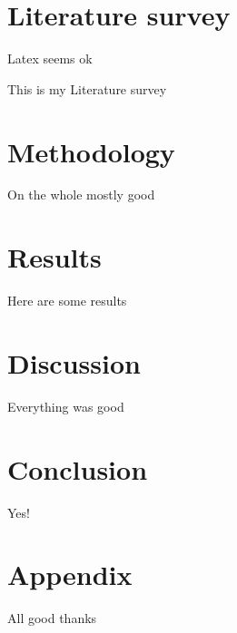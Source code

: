 \documentclass[12pt,a4paper]{article}
\begin{document}
\section{Literature survey}

Latex seems ok \cite{latex:guide}

This is my Literature survey

\section{Methodology}

On the whole mostly good 

\section{Results}

Here are some results 

\section{Discussion}

Everything was good

\section{Conclusion}

Yes!

\section{Appendix}

All good thanks

\printbibliography
\end{document}
